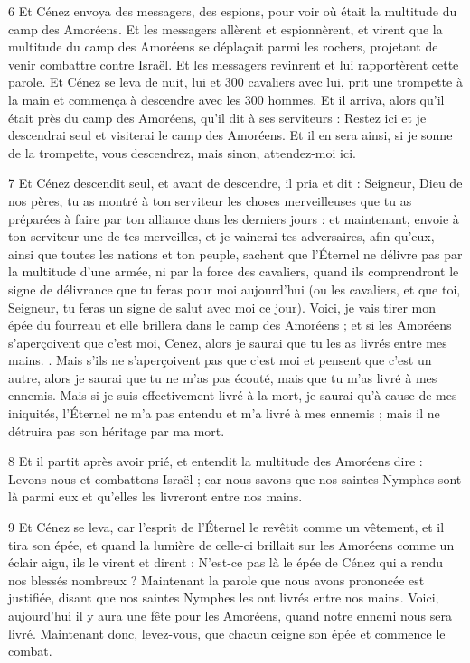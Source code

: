\par 6 Et Cénez envoya des messagers, des espions, pour voir où était la multitude du camp des Amoréens. Et les messagers allèrent et espionnèrent, et virent que la multitude du camp des Amoréens se déplaçait parmi les rochers, projetant de venir combattre contre Israël. Et les messagers revinrent et lui rapportèrent cette parole. Et Cénez se leva de nuit, lui et 300 cavaliers avec lui, prit une trompette à la main et commença à descendre avec les 300 hommes. Et il arriva, alors qu'il était près du camp des Amoréens, qu'il dit à ses serviteurs : Restez ici et je descendrai seul et visiterai le camp des Amoréens. Et il en sera ainsi, si je sonne de la trompette, vous descendrez, mais sinon, attendez-moi ici.

\par 7 Et Cénez descendit seul, et avant de descendre, il pria et dit : Seigneur, Dieu de nos pères, tu as montré à ton serviteur les choses merveilleuses que tu as préparées à faire par ton alliance dans les derniers jours : et maintenant, envoie à ton serviteur une de tes merveilles, et je vaincrai tes adversaires, afin qu'eux, ainsi que toutes les nations et ton peuple, sachent que l'Éternel ne délivre pas par la multitude d'une armée, ni par la force des cavaliers, quand ils comprendront le signe de délivrance que tu feras pour moi aujourd'hui (ou les cavaliers, et que toi, Seigneur, tu feras un signe de salut avec moi ce jour). Voici, je vais tirer mon épée du fourreau et elle brillera dans le camp des Amoréens ; et si les Amoréens s'aperçoivent que c'est moi, Cenez, alors je saurai que tu les as livrés entre mes mains. . Mais s’ils ne s’aperçoivent pas que c’est moi et pensent que c’est un autre, alors je saurai que tu ne m’as pas écouté, mais que tu m’as livré à mes ennemis. Mais si je suis effectivement livré à la mort, je saurai qu'à cause de mes iniquités, l'Éternel ne m'a pas entendu et m'a livré à mes ennemis ; mais il ne détruira pas son héritage par ma mort.

\par 8 Et il partit après avoir prié, et entendit la multitude des Amoréens dire : Levons-nous et combattons Israël ; car nous savons que nos saintes Nymphes sont là parmi eux et qu'elles les livreront entre nos mains.

\par 9 Et Cénez se leva, car l'esprit de l'Éternel le revêtit comme un vêtement, et il tira son épée, et quand la lumière de celle-ci brillait sur les Amoréens comme un éclair aigu, ils le virent et dirent : N'est-ce pas là le épée de Cénez qui a rendu nos blessés nombreux ? Maintenant la parole que nous avons prononcée est justifiée, disant que nos saintes Nymphes les ont livrés entre nos mains. Voici, aujourd'hui il y aura une fête pour les Amoréens, quand notre ennemi nous sera livré. Maintenant donc, levez-vous, que chacun ceigne son épée et commence le combat.


